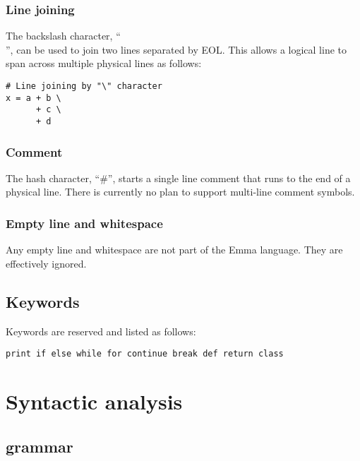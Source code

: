 \documentclass[10pt,a4paper]{article}
\begin{document}
\subsubsection{Line joining}
The backslash character, ``\\'', can be used to join two lines separated by EOL.
This allows a logical line to span across multiple physical lines as follows:
\begin{lstlisting}
# Line joining by "\" character
x = a + b \
      + c \
      + d
\end{lstlisting}

\subsubsection{Comment}
The hash character, ``\#'', starts a single line comment that runs to the end
of a physical line. There is currently no plan to support multi-line
comment symbols.

\subsubsection{Empty line and whitespace}
Any empty line and whitespace are not part of the Emma language. They are
effectively ignored.

\subsection{Keywords}
Keywords are reserved and listed as follows:
\begin{lstlisting}
print if else while for continue break def return class
\end{lstlisting}

\pagebreak


\section{Syntactic analysis}
\subsection{grammar}

\setlength{\grammarparsep}{10pt plus 1pt minus 1pt} %
\setlength{\grammarindent}{12em} %
\end{document}
